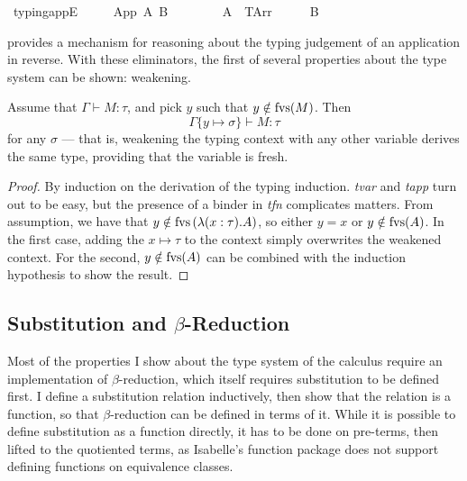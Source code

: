 \begin{implementation}
\isamarkupfalse%
\ typing{\isacharunderscore}appE{\isacharcolon}\isanewline
\ \ \ {\isachardoublequoteopen}{\isasymGamma}\ {\isasymturnstile}\ App\ A\ B\ {\isacharcolon}\ {\isasymsigma}{\isachardoublequoteclose}\isanewline
\ \ \ {\isachardoublequoteopen}{\isasymexists}{\isasymtau}{\isachardot}\ {\isacharparenleft}{\isasymGamma}\ {\isasymturnstile}\ A\ {\isacharcolon}\ {\isacharparenleft}TArr\ {\isasymtau}\ {\isasymsigma}{\isacharparenright}{\isacharparenright}\ {\isasymand}\ {\isacharparenleft}{\isasymGamma}\ {\isasymturnstile}\ B\ {\isacharcolon}\ {\isasymtau}{\isacharparenright}{\isachardoublequoteclose}\isanewline
\end{implementation}

provides a mechanism for reasoning about the typing judgement of an application in reverse.
With these eliminators, the first of several properties about the type system can be shown: weakening.

\begin{theorem}
Assume that \(\Gamma \vdash M : \tau\), and pick \(y\) such that \(y \notin \mathrm{fvs}(M)\).
Then
\[\Gamma\{y \mapsto \sigma\} \vdash M : \tau\]
for any \(\sigma\) --- that is, weakening the typing context with any other variable derives the same type, providing that the variable is fresh.
\end{theorem}
\begin{proof}
By induction on the derivation of the typing induction.
\emph{tvar} and \emph{tapp} turn out to be easy, but the presence of a binder in \emph{tfn} complicates matters.
From assumption, we have that \(y \notin \mathrm{fvs}\left(\lambda (x:\tau). A\right)\), so either \(y = x\) or \(y \notin \mathrm{fvs}(A)\).
In the first case, adding the \(x \mapsto \tau\) to the context simply overwrites the weakened context.
For the second, \(y \notin \mathrm{fvs}(A)\) can be combined with the induction hypothesis to show the result.
\end{proof}

\subsection{Substitution and \(\beta\)-Reduction}
Most of the properties I show about the type system of the calculus require an implementation of \(\beta\)-reduction, which itself requires substitution to be defined first.
I define a substitution relation inductively, then show that the relation is a function, so that \(\beta\)-reduction can be defined in terms of it.
While it is possible to define substitution as a function directly, it has to be done on pre-terms, then lifted to the quotiented terms, as Isabelle's function package does not support defining functions on equivalence classes.

